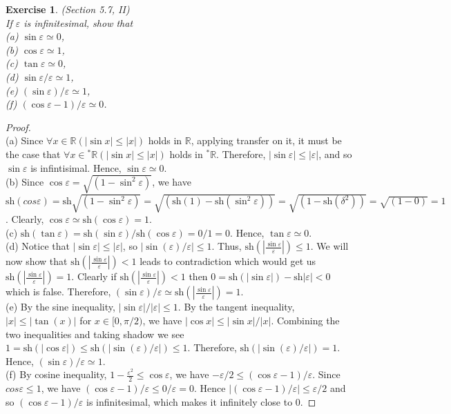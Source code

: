 \documentclass[a4paper, 11pt, openany]{book}
\theoremstyle{plain}
\newtheorem{exercise}{Exercise}[chapter]
\theoremstyle{plain}
\newcommand{\R}{\mathbb{R}}
\newcommand{\ep}{\varepsilon}
\newcommand{\del}{\delta}
\newcommand{\hyp}{{}^*}
\newcommand{\sh}{\text{sh}}
\begin{document}
  \begin{exercise}
    (Section 5.7, II) \\
    If $\ep$ is infinitesimal, show that \\
    (a) $\sin \ep \simeq 0$, \\
    (b) $\cos \ep \simeq 1$, \\
    (c) $\tan \ep \simeq 0$, \\
    (d) $\sin \ep /\ep \simeq 1$, \\
    (e) $(\sin \ep)/\ep \simeq 1$,\\
    (f) $(\cos \ep -1)/\ep \simeq 0$.
  \end{exercise}
  \begin{proof} $ $ \\
    (a) Since $\forall x \in \R (|\sin x| \leq |x|)$ holds in $\R$, applying transfer on it, it must be the case that $\forall x \in \hyp \R (|\sin x| \leq |x|)$ holds in $\hyp \R$. Therefore, $|\sin \ep| \leq |\ep|$, and so $\sin \ep$ is infintisimal. Hence, $\sin \ep \simeq 0$. \\

    (b) Since $\cos \ep=\sqrt{(1-\sin^2 \ep)}$, we have $\sh (cos \ep)=\sh \sqrt{(1-\sin^2 \ep)}=\sqrt{(\sh(1)-\sh(\sin^2 \ep))}=\sqrt{(1-\sh(\del^2))}=\sqrt{(1-0)}=1$. Clearly, $\cos \ep \simeq \sh(\cos \ep)=1$. \\

    (c) $\sh (\tan \ep)=\sh(\sin \ep)/\sh( \cos \ep)=0/1=0$. Hence, $\tan \ep \simeq 0$. \\

    (d) Notice that $|\sin \ep| \leq |\ep|$, so $|\sin (\ep)/\ep| \leq 1$. Thus, $\sh \left( \left| \frac{\sin \ep}{\ep} \right| \right) \leq 1$. We will now show that $\sh \left( \left| \frac{\sin \ep}{\ep} \right| \right)<1$ leads to contradiction which would get us $\sh \left( \left| \frac{\sin \ep}{\ep} \right| \right)=1$. Clearly if $\sh \left( \left| \frac{\sin \ep}{\ep} \right| \right)<1$ then $0=\sh(|\sin \ep|)-\sh|\ep|<0$ which is false. Therefore, $(\sin \ep)/\ep \simeq \sh \left( \left| \frac{\sin \ep}{\ep} \right| \right)=1$. \\

    (e) By the sine inequality, $|\sin \ep|/|\ep| \leq 1$. By the tangent inequality, $|x| \leq |\tan (x)|$ for $x \in [0, \pi/2)$, we have $|\cos x|\leq |\sin x|/|x|$. Combining the two inequalities and taking shadow we see $1=\sh (|\cos \ep|) \leq \sh (|\sin(\ep)/\ep |) \leq 1$. Therefore, $\sh(|\sin(\ep)/\ep |)=1$. Hence, $(\sin \ep)/\ep \simeq 1$. \\

    (f) By cosine inequality, $1-\frac{\ep^2}{2} \leq \cos \ep$, we have $-\ep/2 \leq (\cos \ep -1)/\ep$. Since $cos \ep \leq 1$, we have $(\cos \ep -1)/\ep \leq 0/\ep=0$. Hence $|(\cos \ep-1)/\ep| \leq \ep/2$ and so $(\cos \ep-1)/\ep$ is infinitesimal, which makes it infinitely close to $0$.
  \end{proof}
\end{document}
